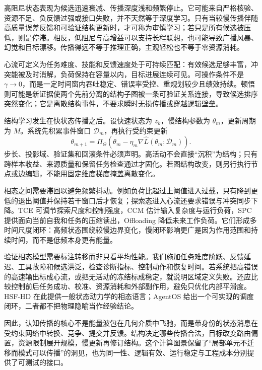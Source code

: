 高阻尼状态表现为候选迅速衰减、传播深度浅和频繁停止。它可能来自严格核验、资源不足、负反馈过强或接口失败，并不天然等于深度学习。只有当较慢传播伴随高质量误差反馈和可验证结构更新时，才可称为审慎学习；若只是所有候选被压低，则是停滞。相反，低阻尼与高增益可以支持长程联想，也可能导致广播风暴、幻觉和目标漂移。传播得远不等于推理正确，主观轻松也不等于零资源消耗。

心流可定义为任务难度、技能和反馈速度处于可持续匹配：有效候选足够丰富，冲突能被及时消解，负荷保持在容量以内，目标进展连续可见。可操作条件不是 $\gamma\to0$，而是一定时间窗内吞吐稳定、错误率受控、重规划较少且绩效持续。顿悟则可能是新证据使两个先前分离的结构子图被一条可验证关系连接，导致候选排序突然变化；它是离散结构事件，不要求瞬时无损传播或穿越逻辑壁垒。

结构学习发生在快状态传播之后。设快速状态为 $z_k$，慢结构参数为 $\theta_m$，更新周期为 $M$。系统先积累事件窗口 $\mathcal{D}_m$，再执行受约束更新
\begin{equation}
\theta_{m+1}=\Pi_{\Theta}\!\left(\theta_m-\eta_m\nabla\widehat L(\theta_m;\mathcal{D}_m)\right).
\end{equation}
步长、投影域、验证集和回滚条件必须声明。高活动不会直接“沉积”为结构；只有跨样本收益、来源质量和保留任务检查通过才固化。若图结构改变，则另行执行节点或边编辑，不能用固定维度梯度掩盖离散变化。

相态之间需要滞回以避免频繁抖动。例如负荷比超过上阈值进入过载，只有降到更低的退出阈值并保持若干窗口后才恢复；探索态进入心流还要求错误与冲突同步下降。TCE 可调节探索尺度和控制强度，CCM 估计输入复杂度与运行负荷，SPC 提供面向当前自我和任务的压缩读出，Offloading 降低未来工作负荷。它们形成多时间尺度闭环：高频状态围绕较慢边界变化，慢闭环影响更广是因为作用范围和持续时间，而不是低频本身更有能量。

验证相态模型需要标注转移而非只看平均性能。我们施加任务难度阶跃、反馈延迟、工具故障和候选洪泛，检查诊断指标、控制动作和恢复时间。若系统把高错误的高速输出标成心流，或把无活动的冻结标成稳定，就说明区域定义失败。还应比较控制前后任务成功、校准、资源消耗和外部副作用，避免只优化内部平滑度。HSF-HD 在此提供一般状态动力学的相态语言；AgentOS 给出一个可实现的调度闭环，二者都不把物理隐喻当作经验结论。

因此，认知传播的核心不是能量波包在几何介质中飞驰，而是带身份的状态消息在受约束网络中转换、竞争、提交并反馈。结构决定哪些传播合法，目标改变路由偏置，资源限制展开规模，慢更新再修订结构。这个计算图景保留了“局部单元不迁移而模式可以传播”的洞见，也为同一性、逻辑有效、运行稳定与工程成本分别提供了可测试的接口。
